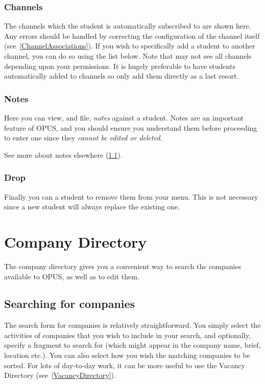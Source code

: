 \documentclass[12 pt]{book}
\begin{document}
\subsection{Channels}

The channels which the student is automatically subscribed to are shown here.
Any errors should be handled by correcting the configuration of the channel
itself (see~\ref{ChannelAssociations}). If you wish to specifically add a student to another
channel, you can do so using the list below. Note that may not see all channels
depending upon your permissions. It is hugely preferable to have students
automatically added to channels so only add them directly as a last resort.

\subsection{Notes}

Here you can view, and file, \emph{notes} against a student. Notes are an
important feature of OPUS, and you should ensure you understand them before
proceeding to enter one since they \emph{cannot be edited or deleted}.

See more about notes elsewhere (\ref{}).

\subsection{Drop}

Finally you can  a student to remove them from your menu. This is
not necessary since a new student will always replace the existing one.

%
%
%

\chapter{Company Directory}
\label{CompanyDirectory}

The company directory gives you a convenient way to search the companies
available to OPUS, as well as to edit them.

\section{Searching for companies}

The search form for companies is relatively straightforward. You simply select
the activities of companies that you wish to include in your search, and
optionally, specify a fragment to search for (which might appear in the
company name, brief, location etc.). You can also select how you wish the
matching companies to be sorted. For lots of day-to-day work, it can be
more useful to use the Vacancy Directory (see~\ref{VacancyDirectory}).
\end{document}
